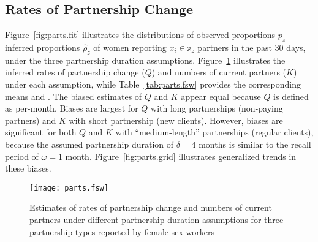 \subsection{Rates of Partnership Change}\label{res.parts}
Figure~\ref{fig:parts.fit} illustrates the distributions of
observed proportions $p_z$ \vs inferred proportions $\hat{\rho}_z$ of women
reporting $x_i \in \mathbb{x}_z$ partners in the past 30 days,
under the three partnership duration assumptions.
Figure~\ref{fig:parts.fsw} illustrates the inferred
rates of partnership change ($Q$) and numbers of current partners ($K$) under each assumption,
while Table~\ref{tab:parts.fsw} provides the corresponding means and \ci.
The biased estimates of $Q$ and $K$ appear equal because $Q$ is defined as per-month.
Biases are largest for
$Q$ with long partnerships (\eg non-paying partners) and
$K$ with short partnership (\eg new clients).
However, biases are significant for
both $Q$ and $K$ with ``medium-length'' partnerships (\eg regular clients),
because the assumed partnership duration of $\delta = 4$ months
is similar to the recall period of $\omega = 1$ month.
Figure~\ref{fig:parts.grid} illustrates generalized trends in these biases.
\begin{figure}
  \centering\texttt{[image: parts.fsw]}
  \caption{Estimates of rates of partnership change and numbers of current partners
    under different partnership duration assumptions
    for three partnership types reported by female sex workers}
  \label{fig:parts.fsw}
\end{figure}
